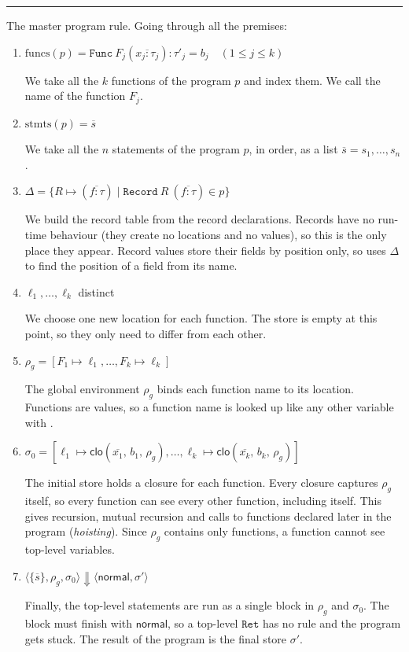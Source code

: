 \documentclass[11pt,a4paper]{article}
\newcommand{\kw}[1]{\mathtt{#1}}                     %
\newcommand{\eval}{\Downarrow}                       %
\newcommand{\config}[1]{\langle #1 \rangle}    %
\newcommand{\clo}[3]{\mathsf{clo}(#1,\, #2,\, #3)}
\newcommand{\rn}[1]{\TirNameStyle{#1}}
\begin{document}
\noindent\rule{\linewidth}{0.4pt}

The master program rule. Going through all the premises:
\begin{enumerate}
	\item $\mathrm{funcs}(p) = \kw{Func}\ F_j (\overline{x_j : \tau_j}) : \tau'_j = b_j \quad (1 \le j \le k)$
	
	We take all the $k$ functions of the program $p$ and index them. We call the name of the function $F_j$.
	
	\item $\mathrm{stmts}(p) = \overline{s}$
	
	We take all the $n$ statements of the program $p$, in order, as a list $\overline{s}=s_1,\ldots,s_n$.
	
	\item $\Delta = \{ R \mapsto (\overline{f : \tau}) \mid \kw{Record}\ R\ (\overline{f : \tau}) \in p \}$
	
	We build the record table from the record declarations. Records have no run-time behaviour (they create no locations and no values), so this is the only place they appear. Record values store their fields by position only, so \rn{E-FIELD} uses $\Delta$ to find the position of a field from its name.
	
	\item $\ell_1, \ldots, \ell_k$ distinct
	
	We choose one new location for each function. The store is empty at this point, so they only need to differ from each other.
	
	\item $\rho_g = [F_1 \mapsto \ell_1, \ldots, F_k \mapsto \ell_k]$
	
	The global environment $\rho_g$ binds each function name to its location. Functions are values, so a function name is looked up like any other variable with \rn{E-VAR}.
	
	\item $\sigma_0 = [\ell_1 \mapsto \clo{\overline{x_1}}{b_1}{\rho_g}, \ldots, \ell_k \mapsto \clo{\overline{x_k}}{b_k}{\rho_g}]$
	
	The initial store holds a closure for each function. Every closure captures $\rho_g$ itself, so every function can see every other function, including itself. This gives recursion, mutual recursion and calls to functions declared later in the program (\textit{hoisting}). Since $\rho_g$ contains only functions, a function cannot see top-level variables.
	
	\item $\config{\{ \overline{s} \}, \rho_g, \sigma_0} \eval \config{\mathsf{normal}, \sigma'}$
	
	Finally, the top-level statements are run as a single block in $\rho_g$ and $\sigma_0$. The block must finish with $\mathsf{normal}$, so a top-level $\kw{Ret}$ has no rule and the program gets stuck. The result of the program is the final store $\sigma'$.
\end{enumerate}
\end{document}
